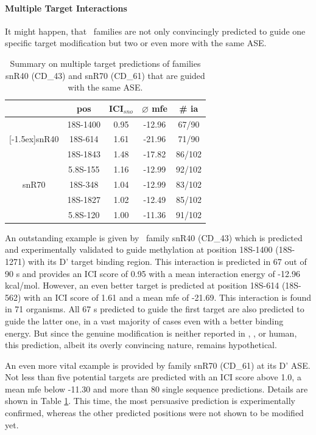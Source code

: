 \paragraph{\textbf{Multiple Target Interactions}}
It might happen, that \sno\ families are not only convincingly
predicted to guide one specific target modification but two or even
more with the same ASE.
\begin{table}
  \caption{Summary on
    multiple target predictions of families snR40 (CD\_43) and snR70 (CD\_61) that are guided with the same ASE.}
  \label{tab:redundant_predictions}
  \begin{center}
    \begin{footnotesize}
      \begin{tabular}{c|c|c|c|c}
        &pos&ICI$_{sno}$&$\varnothing$
          mfe&\# ia\\
        \hline
        &18S-1400&0.95&-12.96&67/90\\
        \raisebox{1.5ex}[-1.5ex]{snR40}&18S-614&1.61&-21.96&71/90\\
        \hline
        &18S-1843&1.48&-17.82&86/102\\
        &5.8S-155&1.16&-12.99&92/102\\
        snR70&18S-348&1.04&-12.99&83/102\\
        &18S-1827&1.02&-12.49&85/102\\
        &5.8S-120&1.00&-11.36&91/102\\
      \end{tabular}
    \end{footnotesize}
  \end{center}
\end{table}
An outstanding example is given by \cd\ family snR40 (CD\_43) which is
predicted and experimentally validated to guide methylation at
position 18S-1400 (18S-1271) with its D' target binding region. This
interaction is predicted in 67 out of 90 \sno s and provides an ICI
score of 0.95 with a mean interaction energy of -12.96
kcal/mol. However, an even better target is predicted at position
18S-614 (18S-562) with an ICI score of 1.61 and a mean mfe of
-21.69. This interaction is found in 71 organisms. All 67 \sno s
predicted to guide the first target are also predicted to guide the
latter one, in a vast majority of cases even with a better binding
energy. But since the genuine modification is neither reported in
\sce, \ncr, or human, this prediction, albeit its overly convincing
nature, remains hypothetical.

An even more vital example is provided by family snR70 (CD\_61) at its
D' ASE.  Not less than five potential targets are predicted with an
ICI score above 1.0, a mean mfe below -11.30 and more than 80 single
sequence predictions. Details are shown in Table
\ref{tab:redundant_predictions}. This time, the most persuasive
prediction is experimentally confirmed, whereas the other predicted
positions were not shown to be modified yet.
